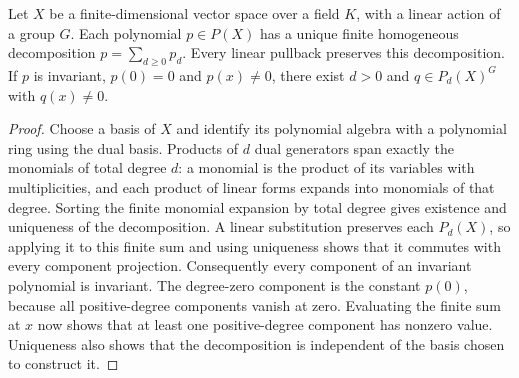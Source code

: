 \begin{lemma}
\label{lem:balanced-homogeneous-extraction}
\leanok
Let $X$ be a finite-dimensional vector space over a field $K$, with a
linear action of a group $G$. Each polynomial $p\in P(X)$ has a unique
finite homogeneous decomposition $p=\sum_{d\geq0}p_d$. Every linear
pullback preserves this decomposition. If $p$ is invariant, $p(0)=0$
and $p(x)\ne0$, there exist $d>0$ and $q\in P_d(X)^G$ with $q(x)\ne0$.
\end{lemma}
\begin{proof}
Choose a basis of $X$ and identify its polynomial algebra with a
polynomial ring using the dual basis. Products of $d$ dual generators
span exactly the monomials of total degree $d$: a monomial is the
product of its variables with multiplicities, and each product of
linear forms expands into monomials of that degree. Sorting the finite
monomial expansion by total degree gives existence and uniqueness
of the decomposition. A linear substitution preserves each $P_d(X)$,
so applying it to this finite sum and using uniqueness shows that
it commutes with every component projection. Consequently every
component of an invariant polynomial is invariant. The degree-zero
component is the constant $p(0)$, because all positive-degree
components vanish at zero. Evaluating the finite sum at $x$ now shows
that at least one positive-degree component has nonzero value.
Uniqueness also shows that the decomposition is independent of the
basis chosen to construct it.
\end{proof}

